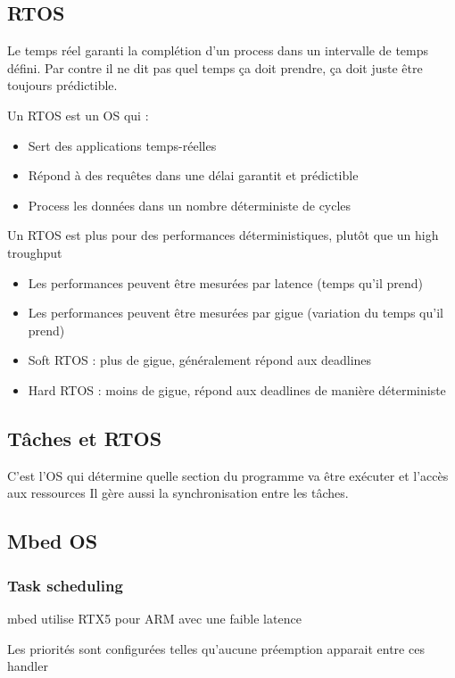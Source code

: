 \documentclass[resume]{subfiles}
\begin{document}
\subsection{RTOS}

Le temps réel garanti la complétion d'un process dans un intervalle de temps défini. Par contre il ne dit pas quel temps ça doit prendre, ça doit juste être toujours prédictible.

Un RTOS est un OS qui :
\begin{itemize}
\item Sert des applications temps-réelles
\item Répond à des requêtes dans une délai garantit et prédictible
\item Process les données dans un nombre déterministe de cycles
\end{itemize}

Un RTOS est plus pour des performances déterministiques, plutôt que un high troughput
\begin{itemize}
\item Les performances peuvent être mesurées par latence (temps qu'il prend)
\item Les performances peuvent être mesurées par gigue (variation du temps qu'il prend)
\item Soft RTOS : plus de gigue, généralement répond aux deadlines
\item Hard RTOS : moins de gigue, répond aux deadlines de manière déterministe
\end{itemize}

\subsection{Tâches et RTOS}

C'est l'OS qui détermine quelle section du programme va être exécuter et l'accès aux ressources Il gère aussi la synchronisation entre les tâches.

\subsection{Mbed OS}

\subsubsection{Task scheduling}

mbed utilise RTX5 pour ARM avec une faible latence

Les priorités sont configurées telles qu'aucune préemption apparait entre ces handler
\end{document}
